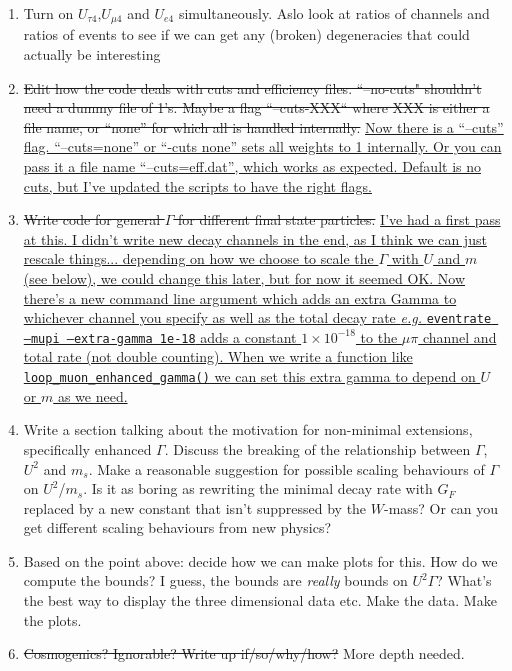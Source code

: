 \documentclass[11pt, a4paper]{article}
\newcommand{\newtext}[2]{\textcolor{#1}{\ul{#2}}}
\begin{document}
\begin{enumerate}
\item Turn on $U_{\tau 4}$,$U_{\mu 4}$ and $U_{e4}$ simultaneously. Aslo look at ratios of channels and ratios of events to see if we can get any (broken) degeneracies that could actually be interesting

\item \sout{Edit how the code deals with cuts and efficiency files.
``--no-cuts" shouldn't need a dummy file of 1's. Maybe a flag ``--cuts-XXX``
where XXX is either a file name, or ``none'' for which all is handled
internally.} \newtext{PB}{Now there is a ``--cuts'' flag. ``--cuts=none'' or
``-cuts none'' sets all weights to 1 internally. Or you can pass it a file name
``--cuts=eff.dat'', which works as expected. Default is no cuts, but I've
updated the scripts to have the right flags.}

\item \sout{Write code for general $\Gamma$ for different final state
particles.} \newtext{PB}{I've had a first pass at this. I didn't write new
decay channels in the end, as I think we can just rescale things...  depending
on how we choose to scale the $\Gamma$ with $U$ and $m$ (see below), we could
change this later, but for now it seemed OK. Now there's a new command
line argument which adds an extra Gamma to whichever channel you specify as well 
as the total decay rate \emph{e.g.} \texttt{eventrate --mupi --extra-gamma 1e-18}
adds a constant $1\times10^{-18}$ to the $\mu\pi$ channel and total rate (not
double counting). When we write a function like \texttt{loop\_muon\_enhanced\_gamma()} we 
can set this extra gamma to depend on $U$ or $m$ as we need.} 

\item Write a section talking about the motivation for non-minimal extensions,
specifically enhanced $\Gamma$. Discuss the breaking of the relationship
between $\Gamma$, $U^2$ and $m_s$.  Make a reasonable suggestion for possible
scaling behaviours of $\Gamma$ on $U^2$/$m_s$. Is it as boring as rewriting the
minimal decay rate with $G_F$ replaced by a new constant that isn't suppressed
by the $W$-mass? Or can you get different scaling behaviours from new physics?

\item Based on the point above: decide how we can make plots for this. How do
we compute the bounds? I guess, the bounds are \emph{really} bounds on
$U^2\Gamma$? What's the best way to display the three dimensional data etc.
Make the data. Make the plots.

\item \sout{Cosmogenics? Ignorable? Write up if/so/why/how?} More depth needed.


\end{enumerate}
\end{document}
